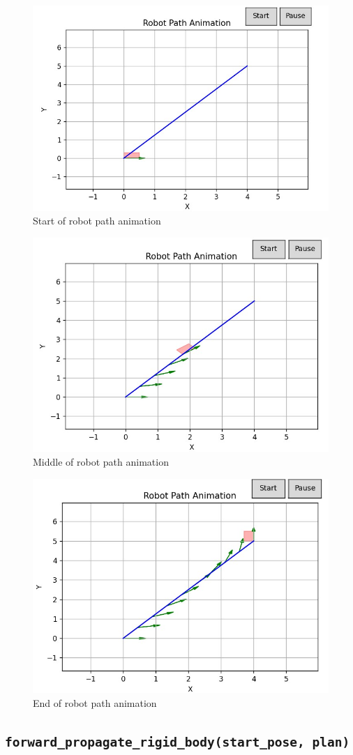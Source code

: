\documentclass{article}
\begin{document}
\begin{figure} [H]
    \centering
    \includegraphics[width=0.5\linewidth]{latex_media/start of robot path anim.jpg}
    \caption{Start of robot path animation}
    \label{fig:3}
\end{figure}

\begin{figure} [H]
    \centering
    \includegraphics[width=0.5\linewidth]{latex_media/middle of robot path anim.jpg}
    \caption{Middle of robot path animation}
    \label{fig:4}
\end{figure}

\begin{figure} [H]
    \centering
    \includegraphics[width=0.5\linewidth]{latex_media/end of robot path anim.jpg}
    \caption{End of robot path animation}
    \label{fig:5}
\end{figure}

\subsection{\texttt{forward\_propagate\_rigid\_body(start\_pose, plan)}}
\end{document}
